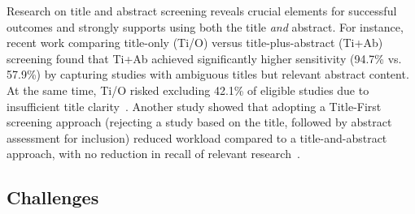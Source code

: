 \documentclass[10pt,oneside]{book}
\begin{document}




Research on title and abstract screening reveals crucial elements for successful outcomes and strongly supports using both the title \emph{and} abstract. For instance, recent work comparing title-only (Ti/O) versus title-plus-abstract (Ti+Ab) screening found that Ti+Ab achieved significantly higher sensitivity (94.7\% vs. 57.9\%) by capturing studies with ambiguous titles but relevant abstract content. At the same time, Ti/O risked excluding 42.1\% of eligible studies due to insufficient title clarity~\cite{teo_title-plus-abstract_2023}. Another study showed that adopting a Title-First screening approach (rejecting a study based on the title, followed by abstract assessment for inclusion) reduced workload compared to a title-and-abstract approach, with no reduction in recall of relevant research~\cite{mateen_titles_2013}.


\subsection{Challenges}
\end{document}
